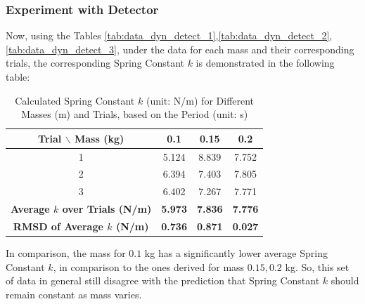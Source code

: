 \documentclass{article}
\begin{document}
\hfil

\subsubsection{Experiment with Detector}
Now, using the Tables \ref{tab:data_dyn_detect_1},\ref{tab:data_dyn_detect_2},\ref{tab:data_dyn_detect_3}, under the data for each mass and their corresponding trials, the corresponding Spring Constant $k$ is demonstrated in the following table:
\begin{table}[h!]
\centering
\caption{Calculated Spring Constant $k$ (unit: N/m) for Different Masses (m) and Trials, based on the Period (unit: s)}
\begin{tabular}{c||c|c|c}
\toprule
\textbf{Trial $\backslash$ Mass (kg)} & \textbf{0.1} & \textbf{0.15} & \textbf{0.2} \\
\midrule
1 & 5.124 & 8.839 & 7.752 \\
\hline
2 & 6.394 & 7.403 & 7.805 \\
\hline
3 & 6.402 & 7.267 & 7.771 \\
\midrule
\midrule
\textbf{Average $k$ over Trials (N/m)} & \textbf{5.973} & \textbf{7.836} & \textbf{7.776} \\
\hline
\textbf{RMSD of Average $k$ (N/m)} & \textbf{0.736} & \textbf{0.871} & \textbf{0.027} \\
\bottomrule
\end{tabular}
\end{table}

\hfill

In comparison, the mass for $0.1$ kg has a significantly lower average Spring Constant $k$, in comparison to the ones derived for mass $0.15, 0.2$ kg. So, this set of data in general still disagree with the prediction that Spring Constant $k$ should remain constant as mass varies.

\hfil

\hfil
\end{document}
